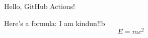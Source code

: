 \documentclass{article}
\begin{document}
Hello, GitHub Actions!

Here's a formula:
I am kindun!!b
\[
E = mc^2
\]
\end{document}
